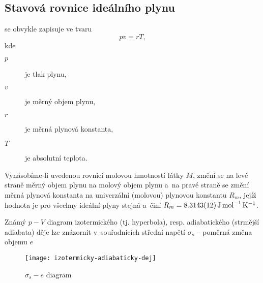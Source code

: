 
\subsection{Stavová rovnice ideálního plynu}
se obvykle zapisuje ve tvaru
\begin{equation}
	p v = r T,
\end{equation}
kde
\begin{description}
	\item[$p$] je tlak plynu,
	\item[$v$] je měrný objem plynu,
	\item[$r$] je měrná plynová konstanta,
	\item[$T$] je absolutní teplota.
\end{description}

Vynásobíme-li uvedenou rovnici molovou hmotností látky $M$, změní se na levé straně měrný objem plynu na molový objem plynu a~na pravé straně se změní měrná plynová konstanta na univerzální (molovou) plynovou konstantu $R_m$, jejíž hodnota je pro všechny ideální plyny stejná a~činí $R_m = \SI{8.3143 \pm 0.0012}{\joule\per\mole\per\kelvin}$.

Známý $p-V$ diagram izotermického (tj. hyperbola), resp. adiabatického (strmější adiabata) děje lze znázornit v~souřadnicích střední napětí $\sigma_s$ -- poměrná změna objemu $e$
\begin{figure}[H]
	\centering
	\texttt{[image: izotermicky-adiabaticky-dej]}
	\caption{$\sigma_s-e$ diagram}
	\label{fig:izotermicky-adiabaticky-dej}
\end{figure}
